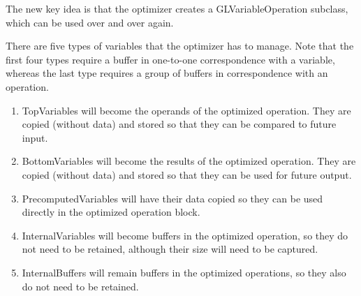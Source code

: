 \documentclass[11pt]{article}
\begin{document}
The new key idea is that the optimizer creates a GLVariableOperation subclass, which can be used over and over again.

There are five types of variables that the optimizer has to manage. Note that the first four types require a buffer in one-to-one correspondence with a variable, whereas the last type requires a group of buffers in correspondence with an operation.
\begin{enumerate}
\item TopVariables will become the operands of the optimized operation. They are copied (without data) and stored so that they can be compared to future input.
\item BottomVariables will become the results of the optimized operation. They are copied (without data) and stored so that they can be used for future output.
\item PrecomputedVariables will have their data copied so they can be used directly in the optimized operation block.
\item InternalVariables will become buffers in the optimized operation, so they do not need to be retained, although their size will need to be captured.
\item InternalBuffers will remain buffers in the optimized operations, so they also do not need to be retained.
\end{enumerate}
\end{document}
